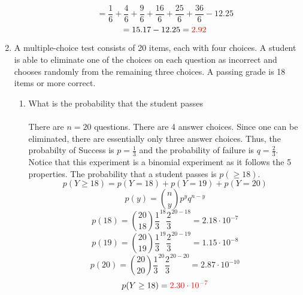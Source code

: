 \documentclass{article}
\begin{document}
\begin{enumerate}
\begin{enumerate}
        \begin{equation*}
            = 
            \frac{1}{6} +
            \frac{4}{6} +
            \frac{9}{6} +
            \frac{16}{6} +
            \frac{25}{6} +
            \frac{36}{6} - 
            12.25
        \end{equation*}
        \begin{equation*}
            = 15.17-12.25=\textcolor{red}{2.92}
        \end{equation*}
        \end{enumerate}
\pagebreak
        \item A multiple-choice test consists of 20 items, each with four choices. A student is able to eliminate one of the choices on each question as incorrect and chooses randomly from the remaining three choices. A passing grade is 18 items or more correct.
        \begin{enumerate}
            \item What is the probability that the student passes\\\\
                There are $n=20$ questions. There are 4 answer choices. Since one can be eliminated, there are essentially only three answer choices. Thus, the probabilty of Success is $p=\frac{1}{3}$ and the probability of failure is $q=\frac{2}{3}$. Notice that this experiment is a binomial experiment as it follows the 5 properties. The probability that a student passes is $p(\geq 18)$.
                \begin{equation*}
                    p(Y\geq 18) = p(Y=18)+p(Y=19)+p(Y=20)
                \end{equation*}
                \begin{equation*}
                    p(y)=\binom{n}{y}p^yq^{n-y}
                \end{equation*}
                \begin{equation*}
                    p(18)=\binom{20}{18}\frac{1}{3}^{18}\frac{2}{3}^{20-18}=2.18\cdot10^{-7}
                \end{equation*}
                \begin{equation*}
                    p(19)=\binom{20}{19}\frac{1}{3}^{19}\frac{2}{3}^{20-19}=1.15\cdot10^{-8}
                \end{equation*}
                \begin{equation*}
                    p(20)=\binom{20}{20}\frac{1}{3}^{20}\frac{2}{3}^{20-20}=2.87\cdot10^{-10}
                \end{equation*}
                \begin{equation*}
                    p(Y\geq 18) = \textcolor{red}{2.30\cdot10^{-7}}
                \end{equation*}
                

\end{enumerate}
\end{enumerate}
\end{document}

